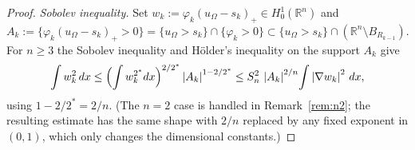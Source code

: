 \documentclass[11pt]{amsart}
\theoremstyle{definition}
\newcommand{\R}{\mathbb R}
\newcommand{\Om}{\Omega}
\newcommand{\abs}[1]{\left|#1\right|}
\newcommand{\dx}{\,dx}
\begin{document}
\begin{proof}
\smallskip
\emph{Sobolev inequality.} Set
$w_k:=\varphi_k(u_\Om-s_k)_+\in H^1_0(\R^n)$ and
\[
   A_k:=\bigl\{\varphi_k(u_\Om-s_k)_+>0\bigr\}
       =\bigl\{u_\Om>s_k\bigr\}\cap\{\varphi_k>0\}
       \subset\{u_\Om>s_k\}\cap(\R^n\setminus B_{R_{k-1}}).
\]
For $n\ge3$ the Sobolev inequality and Hölder's inequality on the support
$A_k$ give
\begin{equation}\label{eq:sobolev}
   \int w_k^2\dx
   \le\Bigl(\int w_k^{2^*}dx\Bigr)^{2/2^*}\abs{A_k}^{1-2/2^*}
   \le S_n^2\,\abs{A_k}^{2/n}\!\int\abs{\nabla w_k}^2\dx,
\end{equation}
using $1-2/2^*=2/n$.
(The $n=2$ case is handled in
Remark~\ref{rem:n2}; the resulting estimate has the same shape with $2/n$
replaced by any fixed exponent in $(0,1)$, which only changes the
dimensional constants.)


\end{proof}
\end{document}
